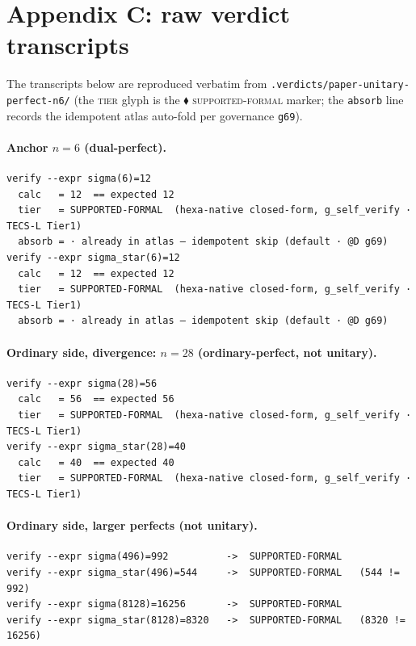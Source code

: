 \documentclass[11pt,a4paper]{article}
\theoremstyle{plain}
\theoremstyle{definition}
\begin{document}
\section{Appendix C: raw verdict transcripts}
\label{sec:raw}

The transcripts below are reproduced verbatim from
\texttt{.verdicts/paper-unitary-perfect-n6/} (the \textsc{tier} glyph is the
$\blacklozenge$ \textsc{supported-formal} marker; the \texttt{absorb} line
records the idempotent atlas auto-fold per governance \texttt{g69}).

\paragraph{Anchor $n=6$ (dual-perfect).}
\begin{verbatim}
verify --expr sigma(6)=12
  calc   = 12  == expected 12
  tier   = SUPPORTED-FORMAL  (hexa-native closed-form, g_self_verify · TECS-L Tier1)
  absorb = · already in atlas — idempotent skip (default · @D g69)
verify --expr sigma_star(6)=12
  calc   = 12  == expected 12
  tier   = SUPPORTED-FORMAL  (hexa-native closed-form, g_self_verify · TECS-L Tier1)
  absorb = · already in atlas — idempotent skip (default · @D g69)
\end{verbatim}

\paragraph{Ordinary side, divergence: $n=28$ (ordinary-perfect, not unitary).}
\begin{verbatim}
verify --expr sigma(28)=56
  calc   = 56  == expected 56
  tier   = SUPPORTED-FORMAL  (hexa-native closed-form, g_self_verify · TECS-L Tier1)
verify --expr sigma_star(28)=40
  calc   = 40  == expected 40
  tier   = SUPPORTED-FORMAL  (hexa-native closed-form, g_self_verify · TECS-L Tier1)
\end{verbatim}

\paragraph{Ordinary side, larger perfects (not unitary).}
\begin{verbatim}
verify --expr sigma(496)=992          ->  SUPPORTED-FORMAL
verify --expr sigma_star(496)=544     ->  SUPPORTED-FORMAL   (544 != 992)
verify --expr sigma(8128)=16256       ->  SUPPORTED-FORMAL
verify --expr sigma_star(8128)=8320   ->  SUPPORTED-FORMAL   (8320 != 16256)
\end{verbatim}
\end{document}
